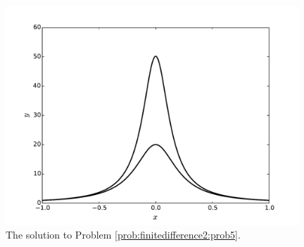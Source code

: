 \begin{figure}
\centering
\includegraphics[width=11cm]{figure5.pdf}
\caption{The solution to Problem \ref{prob:finitedifference2:prob5}.
}
\end{figure}

